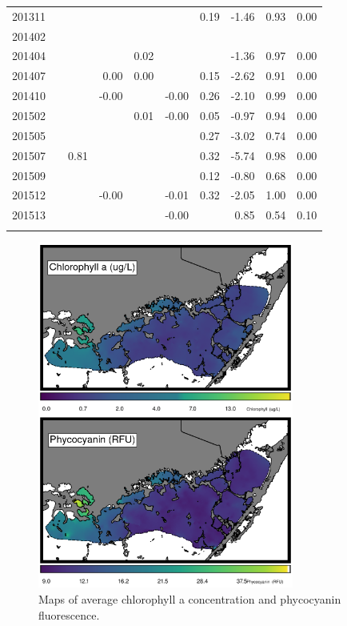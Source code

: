 \begin{table}
\begin{tabular}{rrrrrrrrrr}
 201311 &  &  &  &  &  & 0.19 & -1.46 & 0.93 & 0.00 \\ 
 201402 &  &  &  &  &  &  &  &  &  \\ 
 201404 &  &  &  & 0.02 &  &  & -1.36 & 0.97 & 0.00 \\ 
 201407 &  &  & 0.00 & 0.00 &  & 0.15 & -2.62 & 0.91 & 0.00 \\ 
 201410 &  &  & -0.00 &  & -0.00 & 0.26 & -2.10 & 0.99 & 0.00 \\ 
 201502 &  &  &  & 0.01 & -0.00 & 0.05 & -0.97 & 0.94 & 0.00 \\ 
 201505 &  &  &  &  &  & 0.27 & -3.02 & 0.74 & 0.00 \\ 
 201507 &  & 0.81 &  &  &  & 0.32 & -5.74 & 0.98 & 0.00 \\ 
 201509 &  &  &  &  &  & 0.12 & -0.80 & 0.68 & 0.00 \\ 
 201512 &  &  & -0.00 &  & -0.01 & 0.32 & -2.05 & 1.00 & 0.00 \\ 
 201513 &  &  &  &  & -0.00 &  & 0.85 & 0.54 & 0.10 \\
   \hline
\noalign{\smallskip}\hline
\end{tabular}
\end{table}


\begin{figure}
  \centering
  \includegraphics[width=0.75\textwidth]{../../figures/avmap.png}
  \caption{Maps of average chlorophyll a concentration and phycocyanin fluorescence.}
  \label{fig:6}
\end{figure}

